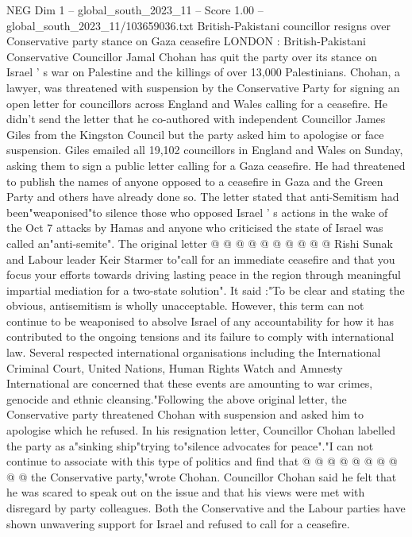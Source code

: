 \begin{textsample}{NEG Dim 1 – global\_south\_2023\_11 – Score 1.00 – global\_south\_2023\_11/103659036.txt}  \label{ex:f1_neg_326}
British-Pakistani councillor resigns over Conservative party stance on Gaza ceasefire LONDON : British-Pakistani Conservative Councillor Jamal Chohan has quit the party over its stance on Israel ' s war on Palestine and the killings of over 13,000 Palestinians.
Chohan, a lawyer, was threatened with suspension by the Conservative Party for signing an open letter for councillors across England and Wales calling for a ceasefire.
He didn't send the letter that he co-authored with independent Councillor James Giles from the Kingston Council but the party asked him to apologise or face suspension.
Giles emailed all 19,102 councillors in England and Wales on Sunday, asking them to sign a public letter calling for a Gaza ceasefire.
He had threatened to publish the names of anyone opposed to a ceasefire in Gaza and the Green Party and others have already done so.
The letter stated that anti-Semitism had been"weaponised"to silence those who opposed Israel ' s actions in the wake of the Oct 7 attacks by Hamas and anyone who criticised the state of Israel was called an"anti-semite".
The original letter @ @ @ @ @ @ @ @ @ @ Rishi Sunak and Labour leader Keir Starmer to"call for an immediate ceasefire and that you focus your efforts towards driving lasting peace in the region through meaningful impartial mediation for a two-state solution".
It said :"To be clear and stating the obvious, antisemitism is wholly unacceptable.
However, this term can not continue to be weaponised to absolve Israel of any accountability for how it has contributed to the ongoing tensions and its failure to comply with international law.
Several respected international organisations including the International Criminal Court, United Nations, Human Rights Watch and Amnesty International are concerned that these events are amounting to war crimes, genocide and ethnic cleansing."Following the above original letter, the Conservative party threatened Chohan with suspension and asked him to apologise which he refused.
In his resignation letter, Councillor Chohan labelled the party as a"sinking ship"trying to"silence advocates for peace"."I can not continue to associate with this type of politics and find that @ @ @ @ @ @ @ @ @ @ the Conservative party,"wrote Chohan.
Councillor Chohan said he felt that he was scared to speak out on the issue and that his views were met with disregard by party colleagues.
Both the Conservative and the Labour parties have shown unwavering support for Israel and refused to call for a ceasefire.

\end{textsample}
